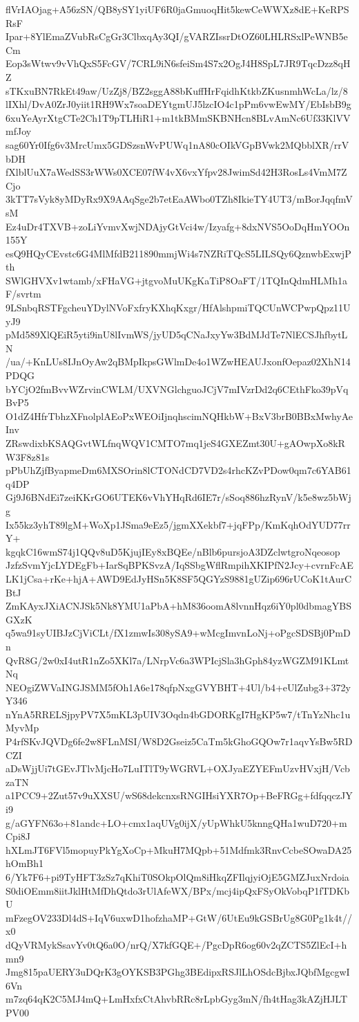flVrIAOjag+A56zSN/QB8ySY1yiUF6R0jaGmuoqHit5kewCeWWXz8dE+KeRPSRsF
Ipar+8YlEmaZVubRsCgGr3ClbxqAy3QI/gVARZIssrDtOZ60LHLRSxlPeWNB5eCm
Eop3sWtwv9vVhQxS5FcGV/7CRL9iN6sfeiSm4S7x2OgJ4H8SpL7JR9TqcDzz8qHZ
sTKxuBN7RkEt49aw/UzZj8/BZ2sggA88bKuffHrFqidhKtkbZKusnmhWcLa/lz/8
lIXhl/DvA0ZrJ0yiit1RH9Wx7soaDEYtgmUJ5lzcIO4c1pPm6vwEwMY/EbIsbB9g
6xuYeAyrXtgCTe2Ch1T9pTLHiR1+m1tkBMmSKBNHcn8BLvAmNc6Uf33KlVVmfJoy
sag60Yr0Ifg6v3MrcUmx5GDSzsnWvPUWq1nA80cOIkVGpBVwk2MQbblXR/rrVbDH
fXlblUuX7aWedSS3rWWs0XCE07fW4vX6vxYfpv28JwimSd42H3RosLs4VmM7ZCjo
3kTT7sVyk8yMDyRx9X9AAqSge2b7etEaAWbo0TZh8IkieTY4UT3/mBorJqqfmVsM
Ez4uDr4TXVB+zoLiYvmvXwjNDAjyGtVci4w/Izyafg+8dxNVS5OoDqHmYOOn155Y
esQ9HQyCEvstc6G4MlMfdB211890mmjWi4s7NZRiTQcS5LILSQy6QznwbExwjPth
SWlGHVXv1wtamb/xFHaVG+jtgvoMuUKgKaTiP8OaFT/1TQInQdmHLMh1aF/svrtm
9LSnbqRSTFgcheuYDylNVoFxfryKXhqKxgr/HfAlshpmiTQCUnWCPwpQpz11UyJ9
pMd589XlQEiR5yti9inU8lIvmWS/jyUD5qCNaJxyYw3BdMJdTe7NlECSJhfbytLN
/ua/+KnLUs8IJnOyAw2qBMpIkpsGWlmDe4o1WZwHEAUJxonfOepaz02XhN14PDQG
bYCjO2fmBvvWZrvinCWLM/UXVNGlchguoJCjV7mIVzrDd2q6CEthFko39pVqBvP5
O1dZ4HfrTbhzXFnolplAEoPxWEOiIjnqhscimNQHkbW+BxV3brB0BBxMwhyAeInv
ZRswdixbKSAQGvtWLfnqWQV1CMTO7mq1jeS4GXEZmt30U+gAOwpXo8kRW3F8z81s
pPbUhZjfByapmeDm6MXSOrin8lCTONdCD7VD2s4rhcKZvPDow0qm7c6YAB61q4DP
Gj9J6BNdEi7zeiKKrGO6UTEK6vVhYHqRd6IE7r/sSoq886hzRynV/k5e8wz5bWjg
Ix55kz3yhT89lgM+WoXp1JSma9eEz5/jgmXXekbf7+jqFPp/KmKqhOdYUD77rrY+
kgqkC16wmS74j1QQv8uD5KjujIEy8xBQEe/nBlb6pursjoA3DZclwtgroNqeosop
JzfzSvmYjcLYDEgFb+IarSqBPKSvzA/IqSSbgWflRmpihXKIPfN2Jcy+cvrnFcAE
LK1jCsa+rKe+hjA+AWD9EdJyHSn5K8SF5QGYzS9881gUZip696rUCoK1tAurCBtJ
ZmKAyxJXiACNJSk5Nk8YMU1aPbA+hM836oomA8lvnnHqz6iY0pl0dbmagYBSGXzK
q5wa91syUIBJzCjViCLt/fX1zmwIs308ySA9+wMcgImvnLoNj+oPgcSDSBj0PmDn
QvR8G/2w0xI4utR1nZo5XKl7a/LNrpVc6a3WPIcjSla3hGph84yzWGZM91KLmtNq
NEOgiZWVaINGJSMM5fOh1A6e178qfpNxgGVYBHT+4Ul/b4+eUlZubg3+372yY346
nYnA5RRELSjpyPV7X5mKL3pUIV3Oqdn4bGDORKgI7HgKP5w7/tTnYzNhc1uMyvMp
P4rfSKvJQVDg6fe2w8FLnMSI/W8D2Gseiz5CaTm5kGhoGQOw7r1aqvYsBw5RDCZI
aDsWjjUi7tGEvJTlvMjcHo7LuITlT9yWGRVL+OXJyaEZYEFmUzvHVxjH/VcbzaTN
a1PCC9+2Zut57v9uXXSU/wS68dekcnxsRNGIHsiYXR7Op+BeFRGg+fdfqqczJYi9
g/aGYFN63o+81andc+LO+cmx1aqUVg0ijX/yUpWhkU5knngQHa1wuD720+mCpi8J
hXLmJT6FVl5mopuyPkYgXoCp+MkuH7MQpb+51Mdfmk3RnvCcbeSOwaDA25hOmBh1
6/Yk7F6+pi9TyHFT3zSz7qKhiT0SOkpOlQm8iHkqZFIlqjyiOjE5GMZJuxNrdoia
S0diOEmm8iitJklHtMfDhQtdo3rUlAfeWX/BPx/mcj4ipQxFSyOkVobqP1fTDKbU
mFzegOV233Dl4dS+IqV6uxwD1hofzhaMP+GtW/6UtEu9kGSBrUg8G0Pg1k4t//x0
dQyVRMykSsavYv0tQ6a0O/nrQ/X7kfGQE+/PgcDpR6og60v2qZCTS5ZlEcI+hmn9
Jmg815paUERY3uDQrK3gOYKSB3PGhg3BEdipxRSJlLhOSdcBjbxJQbfMgcgwI6Vn
m7zq64qK2C5MJ4mQ+LmHxfxCtAhvbRRc8rLpbGyg3mN/fh4tHag3kAZjHJLTPV00
